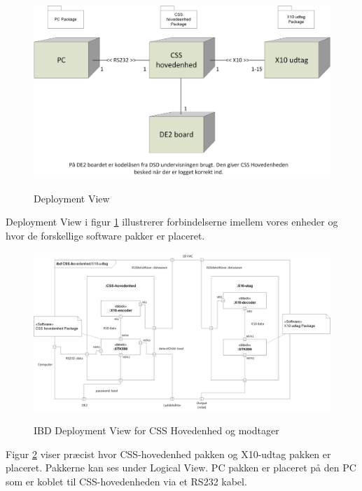 
\begin{figure}[!htb]
     {\includegraphics[width=\textwidth]{billeder/uml/deployment_model}}
     \caption{Deployment View}
     \label{fig:Deployment model}
\end{figure}

Deployment View i figur \ref{fig:Deployment model} illustrerer forbindelserne imellem vores enheder og hvor de forskellige software pakker er placeret.

\begin{figure}[!htb]
     {\includegraphics[width=\textwidth]{billeder/uml/CSS_Hovedenhed_modtager_deployment}}
     \caption{IBD Deployment View for CSS Hovedenhed og modtager }
     \label{fig:IBD Deployment model}
\end{figure}

Figur \ref{fig:IBD Deployment model} viser præcist hvor CSS-hovedenhed pakken og X10-udtag pakken er placeret. Pakkerne kan ses under Logical View. PC pakken er placeret på den PC som er koblet til CSS-hovedenheden via et RS232 kabel.